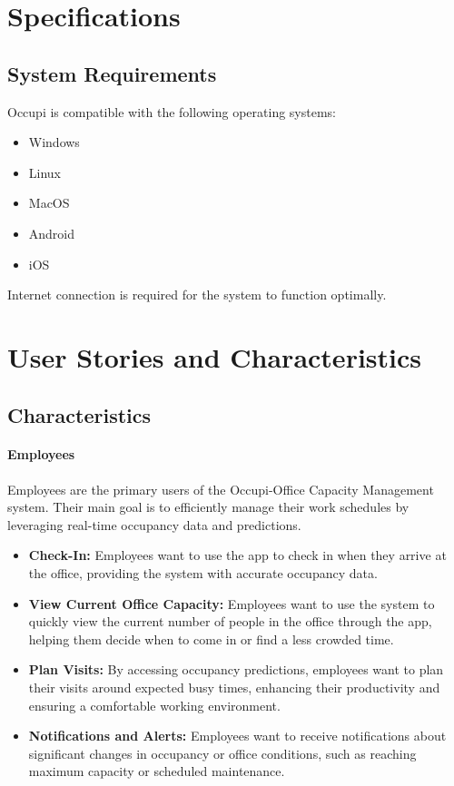 \documentclass[11pt,a4paper]{article}
\begin{document}
\section*{Specifications}

\subsection*{System Requirements}
Occupi is compatible with the following operating systems:
\begin{itemize}
    \item Windows
    \item Linux
    \item MacOS
    \item Android
    \item iOS
\end{itemize}
Internet connection is required for the system to function optimally.

\pagebreak

\section*{User Stories and Characteristics}

\subsection*{Characteristics}

\paragraph{Employees}
Employees are the primary users of the Occupi-Office Capacity Management system. Their main goal is to efficiently manage their work schedules by leveraging real-time occupancy data and predictions.

\begin{itemize}
    \item \textbf{Check-In:} Employees want to use the app to check in when they arrive at the office, providing the system with accurate occupancy data.
    \item \textbf{View Current Office Capacity:} Employees want to use the system to quickly view the current number of people in the office through the app, helping them decide when to come in or find a less crowded time.
    \item \textbf{Plan Visits:} By accessing occupancy predictions, employees want to plan their visits around expected busy times, enhancing their productivity and ensuring a comfortable working environment.
    \item \textbf{Notifications and Alerts:} Employees want to receive notifications about significant changes in occupancy or office conditions, such as reaching maximum capacity or scheduled maintenance.
\end{itemize}
\end{document}
